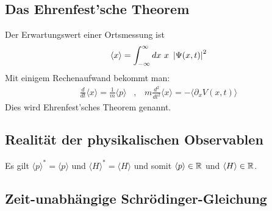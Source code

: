 \subsection{Das Ehrenfest'sche Theorem}

Der Erwartungswert einer Ortsmessung ist
\begin{align*}
    \langle x \rangle = \int_{-\infty}^\infty dx \ x \ \left\vert \Psi(x,t) \right\vert^2
\end{align*}
Mit einigem Rechenaufwand bekommt man:
\begin{align*}
    \frac{d}{dt} \langle x \rangle = \frac{1}{m} \langle p \rangle
    \hspace{10pt} , \hspace{10pt}
    m \frac{d^2}{dt^2} \langle x \rangle = - \langle \partial_x V(x,t) \rangle
\end{align*}
Dies wird Ehrenfest'sches Theorem genannt.

\subsection{Realität der physikalischen Observablen}

Es gilt $\langle p \rangle^\ast = \langle p \rangle$ und $\langle H \rangle^\ast
= \langle H \rangle$ und somit $\langle p \rangle \in \mathbb{R}$ und $\langle H \rangle
\in \mathbb{R}$.

\subsection{Zeit-unabhängige Schrödinger-Gleichung}

